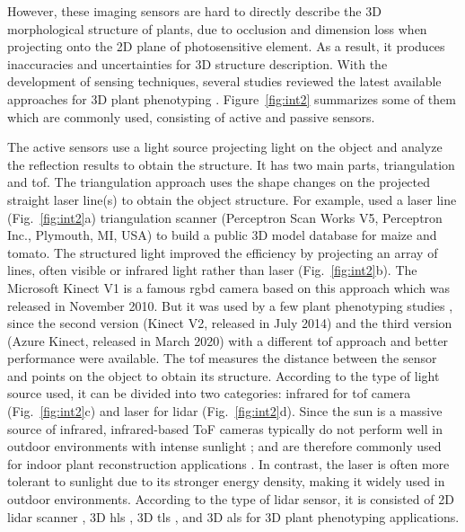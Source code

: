 However, these imaging sensors are hard to directly describe the 3D morphological structure of plants, due to occlusion and dimension loss when projecting onto the 2D plane of photosensitive element. As a result, it produces inaccuracies and uncertainties for 3D structure description. With the development of sensing techniques, several studies reviewed the latest available approaches for 3D plant phenotyping \citep{paulus_measuring_2019, okura_3d_2022, kochi_introduction_2021}. Figure~\ref{fig:int2} summarizes some of them which are commonly used, consisting of active and passive sensors.



The active sensors use a light source projecting light on the object and analyze the reflection results to obtain the structure. It has two main parts, triangulation and \gls{tof}. The triangulation approach uses the shape changes on the projected straight laser line(s) to obtain the object structure. For example, \citet[Figure~3]{schunck_pheno4d_2021} used a laser line (Fig.~\ref{fig:int2}a) triangulation scanner (Perceptron Scan Works V5, Perceptron Inc., Plymouth, MI, USA) to build a public 3D model database for maize and tomato. The structured light improved the efficiency by projecting an array of lines, often visible or infrared light rather than laser (Fig.~\ref{fig:int2}b). The Microsoft Kinect V1 is a famous \gls{rgbd} camera based on this approach which was released in November 2010. But it was used by a few plant phenotyping studies \citep{nguyen_structured_2015}, since the second version (Kinect V2, released in July 2014) and the third version (Azure Kinect, released in March 2020) with a different \gls{tof} approach and better performance \citep{tolgyessy_evaluation_2021, lachat_assessment_2015} were available. The \acrfull{tof} measures the distance between the sensor and points on the object to obtain its structure. According to the type of light source used, it can be divided into two categories: infrared for \gls{tof} camera (Fig.~\ref{fig:int2}c) and laser for \gls{lidar} (Fig.~\ref{fig:int2}d). Since the sun is a massive source of infrared, infrared-based ToF cameras typically do not perform well in outdoor environments with intense sunlight \citep{tolgyessy_evaluation_2021}; and are therefore commonly used for indoor plant reconstruction applications \citep{martinez_low_2019, zhang_3d_2020, xu_global_2023}. In contrast, the laser is often more tolerant to sunlight due to its stronger energy density, making it widely used in outdoor environments. According to the type of \gls{lidar} sensor, it is consisted of 2D \gls{lidar} scanner \citep{garrido_3d_2015}, 3D \gls{hls} \citep{ma_calculation_2019}, 3D \gls{tls} \citep{wu_accurate_2019, su_estimation_2018, qiu_field-based_2019}, and 3D \gls{als} \citep{ten_biomass_2019, nguyen_uav_2023} for 3D plant phenotyping applications.


